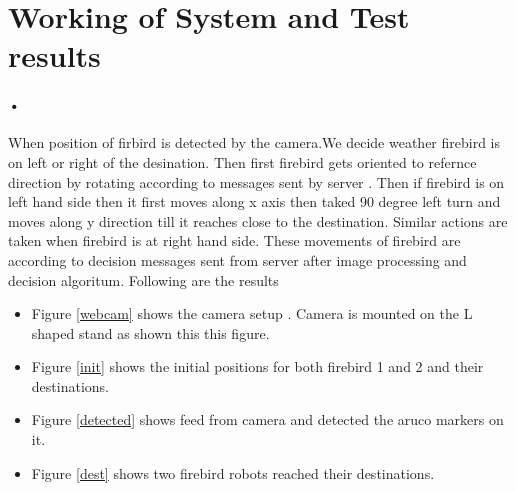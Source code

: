 \documentclass[]{exam}
\begin{document}
\section{\color{red} Working of System and Test results }

\paragraph{•}
When position of firbird is detected by the camera.We decide weather firebird is on left or right of the desination. Then first firebird gets oriented to refernce direction by rotating according to messages sent by server . Then if firebird is on left hand side then it first moves along x axis then taked 90 degree left turn and moves along y direction till it reaches close to the destination. Similar actions are taken when firebird is at right hand side. These movements of firebird are according to decision messages sent from server after image processing and decision algoritum. Following are the results 

\begin{itemize}
\item Figure \ref{webcam} shows the camera setup . Camera is mounted on the L shaped stand as shown this this figure. 
\item Figure \ref{init} shows the initial positions for both firebird 1 and 2 and their destinations.
\item Figure \ref{detected} shows feed from camera and detected the aruco markers on it. 
\item Figure \ref{dest} shows two firebird robots reached their destinations.
\end{itemize}
\end{document}
